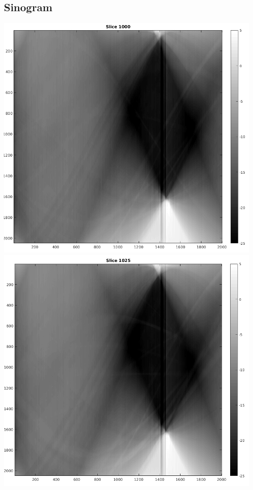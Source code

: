 \documentclass[10pt,a4paper,titlepage]{article}
\begin{document}
	\subsection{Sinogram}
		\label{SinoImg}
		\includegraphics[width=\textwidth]{sinograms/Slice1000.png}
		\includegraphics[width=\textwidth]{sinograms/Slice1025.png}
\end{document}
